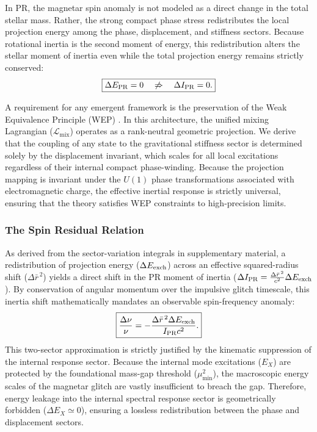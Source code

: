 \documentclass[11pt]{article}
\begin{document}
In PR, the magnetar spin anomaly is not modeled as a direct change in the total stellar mass. Rather, the strong compact phase stress redistributes the local projection energy among the phase, displacement, and stiffness sectors. Because rotational inertia is the second moment of energy, this redistribution alters the stellar moment of inertia even while the total projection energy remains strictly conserved:
\begin{equation}
\boxed{
\Delta E_{\rm PR}=0
\quad
\not\Rightarrow
\quad
\Delta I_{\rm PR}=0.
}
\end{equation}

A requirement for any emergent framework is the preservation of the Weak Equivalence Principle (WEP) \cite{Will2014}. In this architecture, the unified mixing Lagrangian ($\mathcal{L}_{\text{mix}}$) operates as a rank-neutral geometric projection. We derive that the coupling of any state to the gravitational stiffness sector is determined solely by the displacement invariant, which scales for all local excitations regardless of their internal compact phase-winding. Because the projection mapping is invariant under the $U(1)$ phase transformations associated with electromagnetic charge, the effective inertial response is strictly universal, ensuring that the theory satisfies WEP constraints to high-precision limits.

\subsubsection{The Spin Residual Relation}
As derived from the sector-variation integrals in supplementary material, a redistribution of projection energy ($\Delta E_{\rm exch}$) across an effective squared-radius shift ($\Delta\bar r^{\,2}$) yields a direct shift in the PR moment of inertia ($\Delta I_{\rm PR} = \frac{\Delta\bar r^{\,2}}{c^2}\Delta E_{\rm exch}$). By conservation of angular momentum over the impulsive glitch timescale, this inertia shift mathematically mandates an observable spin-frequency anomaly:
\begin{equation}
\boxed{
\frac{\Delta\nu}{\nu}
=
-
\frac{
\Delta\bar r^{\,2}\Delta E_{\rm exch}
}{
I_{\rm PR}c^2
}.
}
\end{equation}
This two-sector approximation is strictly justified by the kinematic suppression of the internal response sector. Because the internal mode excitations ($E_X$) are protected by the foundational mass-gap threshold ($\mu_{\min}^2$), the macroscopic energy scales of the magnetar glitch are vastly insufficient to breach the gap. Therefore, energy leakage into the internal spectral response sector is geometrically forbidden ($\Delta E_X \simeq 0$), ensuring a lossless redistribution between the phase and displacement sectors.
\end{document}
